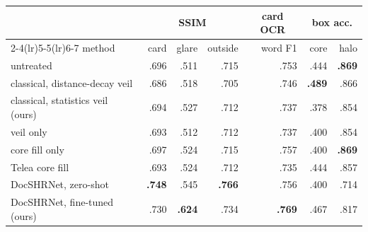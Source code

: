 \begin{tabular}{lrrrrrr}
\toprule
 & \multicolumn{3}{c}{SSIM} & \multicolumn{1}{c}{card OCR} & \multicolumn{2}{c}{box acc.} \\
\cmidrule(lr){2-4}\cmidrule(lr){5-5}\cmidrule(lr){6-7}
method & card & glare & outside & word F1 & core & halo \\
\midrule
untreated & .696 & .511 & .715 & .753 & .444 & \textbf{.869} \\
classical, distance-decay veil & .686 & .518 & .705 & .746 & \textbf{.489} & .866 \\
classical, statistics veil (ours) & .694 & .527 & .712 & .737 & .378 & .854 \\
\quad veil only & .693 & .512 & .712 & .737 & .400 & .854 \\
\quad core fill only & .697 & .524 & .715 & .757 & .400 & \textbf{.869} \\
\quad Telea core fill & .693 & .524 & .712 & .735 & .444 & .857 \\
DocSHRNet, zero-shot & \textbf{.748} & .545 & \textbf{.766} & .756 & .400 & .714 \\
DocSHRNet, fine-tuned (ours) & .730 & \textbf{.624} & .734 & \textbf{.769} & .467 & .817 \\
\bottomrule
\end{tabular}

